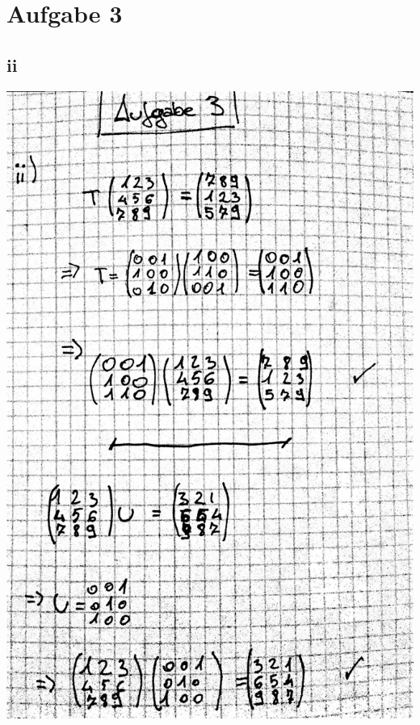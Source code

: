 \documentclass[12pt,a4paper]{article}
\begin{document}
\section{Aufgabe 3}
\subsection{ii}
\includegraphics[scale=0.2]{lat4f_1.jpg} 

\newpage
\end{document}
